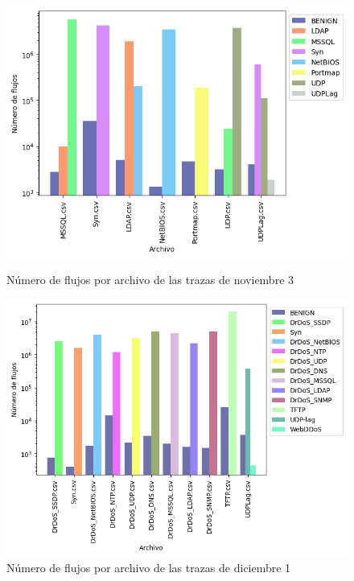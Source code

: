 \begin{figure}[!htb]
      \includegraphics[width=\linewidth]{media/cicddos_2019_csv_03-11_file_results.png}
      \captionsetup{justification=centering}
      \caption{Número de flujos por archivo de las trazas de noviembre 3}\label{fig:cicddos_2019_csv_03-11_file_results}
    \endminipage\hfill
      \includegraphics[width=\linewidth]{media/cicddos_2019_csv_01-12_file_results.png}
      \captionsetup{justification=centering}
      \caption{Número de flujos por archivo de las trazas de diciembre 1}\label{fig:cicddos_2019_csv_01-12_file_results}
    \endminipage\hfill
\end{figure}

